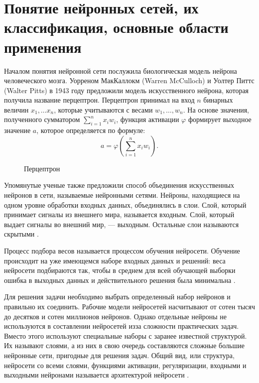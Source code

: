 \chapter{Понятие нейронных сетей, их классификация, основные области применения}
Началом понятия нейронной сети послужила биологическая модель нейрона человеческого мозга.
Уорреном МакКаллокм (Warren McCulloch) и Уолтер Питтс (Walter Pitts) в 1943 году предложили
модель искусственного нейрона, которая получила название перцептрон. Перцептрон принимал на вход $n$ бинарных величин $x_1, \dots x_n$,
которые учитываются с весами $w_1, \dots, w_n$. На основе значения, полученного сумматором $\sum_{i=1}^n x_i w_i$, функция активации
$\varphi$ формирует выходное значение $a$, которое определяется по формуле:
\begin{equation}
    a = \varphi \left( \sum\limits_{i=1}^n x_i w_i \right).
\end{equation}

\begin{figure}[H]
	\caption{Перцептрон}
\end{figure}

Упомянутые ученые также предложили способ объединения искусственных нейронов в сети, называемые нейронными сетями.
Нейроны, находящиеся на одном уровне обработки входных данных, объединялись в слои.
Слой, который принимает сигналы из внешнего мира, называется входным. Слой, который выдает сигналы во внешний мир, —
выходным. Остальные слои называются скрытыми \cite{sozykin}.

Процесс подбора весов называется процессом обучения нейросети.
Обучение происходит на уже имеющемся наборе входных данных и
решений: веса нейросети подбираются так, чтобы в среднем для всей
обучающей выборки ошибка в выходных данных и действительного
решения была минимальна \cite{cyber_alex}.

Для решения задачи необходимо выбрать определенный набор
нейронов и правильно их соединить. Рабочие модели нейросетей
насчитывают от сотен тысяч до десятков и сотен миллионов нейронов.
Однако отдельные нейроны не используются в составлении нейросетей изза сложности практических задач. Вместо этого используют специальные
наборы с заранее известной структурой. Их называют слоями, а из них в
свою очередь составляются сложные большие нейронные сети, пригодные
для решения задач. Общий вид, или структура, нейросети со всеми слоями,
функциями активации, регуляризации, входными и выходными нейронами
называется архитектурой нейросети \cite{cyber_alex}.

